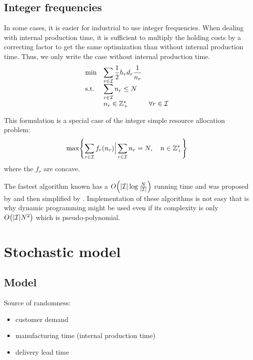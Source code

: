 

\subsection{Integer frequencies}


In some cases, it is easier for industrial to use integer frequencies. When dealing with internal production time, it is sufficient to multiply the holding costs by a correcting factor to get the same optimization than without internal production time. Thus, we only write the case without internal production time.
\begin{equation}
  \begin{array}{lll}
  \min & \displaystyle\sum_{r\in\mathcal{I}} \frac{1}{2}h_rd_r\frac{1}{n_r} \\
  \text{s.t.}  & \displaystyle\sum_{r\in\mathcal{I}} n_r \le N \\
       & n_r \in \mathbb{Z}_+^* & \forall r\in\mathcal{I}
  \end{array}
\end{equation}

This formulation is a special case of the integer simple resource allocation problem:
\begin{equation}
  \max\crbracket{\sum_{r\in\REF} f_r\bracket{\freq_r} \Big| \sum_{r\in\REF}\freq_r=\nbsetups,\quad\freq\in \ZZ_+^*}
\end{equation}
where the $f_r$ are concave.

The fastest algorithm known has a $O\bracket{\card{\REF}\log{\frac{\nbsetups}{\card{\REF}}}}$ running time and was proposed by \cite{Frederickson1982} and then simplified by \cite{Hochbaum1994}. Implementation of these algorithms is not easy that is why dynamic programming might be used even if its complexity is only $O\bracket{\card{\REF}\nbsetups^2}$ which is pseudo-polynomial.



\section{Stochastic model}


\subsection{Model}

Source of randomness:
\begin{itemize}
  \item customer demand
  \item manufacturing time (internal production time)
  \item delivery lead time
\end{itemize}

